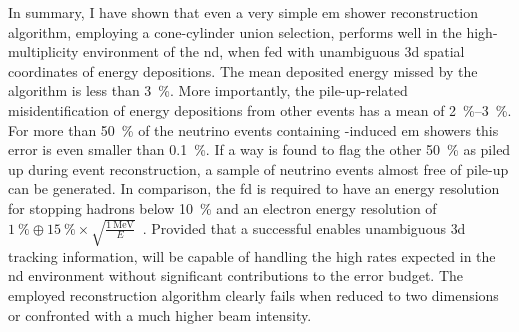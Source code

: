 In summary, I have shown that even a very simple \gls{em} shower reconstruction algorithm, employing a cone-cylinder union selection, performs well in the high-multiplicity environment of the \dune{} \gls{nd}, when fed with unambiguous \gls{3d} spatial coordinates of energy depositions.
The mean deposited energy missed by the algorithm is less than \SI{3}{\percent}.
More importantly, the pile-up-related misidentification of energy depositions from other events has a mean of \SIrange{2}{3}{\percent}.
For more than \SI{50}{\percent} of the neutrino events containing \Pgpz-induced \gls{em} showers this error is even smaller than \SI{0.1}{\percent}.
If a way is found to flag the other \SI{50}{\percent} as piled up during event reconstruction, a sample of neutrino events almost free of pile-up can be generated.
In comparison, the \gls{fd} is required to have an energy resolution for stopping hadrons below \SI{10}{\percent} and an electron energy resolution of $\SI{1}{\percent} \oplus \SI{15}{\percent} \times \sqrt{\frac{\SI{1}{\mega\electronvolt}}{E}}$~\cite{dune4}.
Provided that a successful \larpix{} enables unambiguous \gls{3d} tracking information, \AC{} will be capable of handling the high rates expected in the \dune{} \gls{nd} environment without significant contributions to the error budget.
The employed reconstruction algorithm clearly fails when reduced to two dimensions or confronted with a much higher beam intensity.